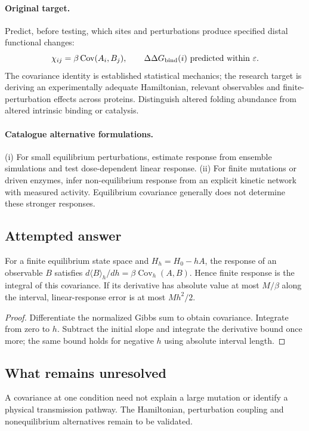 \documentclass[11pt]{article}
\begin{document}
\paragraph{Original target.}
Predict, before testing, which sites and perturbations produce specified distal functional changes:
\[\chi_{ij}=\beta\operatorname{Cov}(A_i,B_j),\qquad \Delta\Delta G_{\rm bind}(i)\ \text{predicted within }\varepsilon.\]
The covariance identity is established statistical mechanics; the research target is deriving an experimentally adequate Hamiltonian, relevant observables and finite-perturbation effects across proteins. Distinguish altered folding abundance from altered intrinsic binding or catalysis.
\paragraph{Catalogue alternative formulations.}
(i) For small equilibrium perturbations, estimate response from ensemble simulations and test dose-dependent linear response. (ii) For finite mutations or driven enzymes, infer non-equilibrium response from an explicit kinetic network with measured activity. Equilibrium covariance generally does not determine these stronger responses.
\subsection{Attempted answer}
\begin{proposition}
For a finite equilibrium state space and $H_h=H_0-hA$, the response of an observable $B$ satisfies $d\langle B\rangle_h/dh=\beta\operatorname{Cov}_h(A,B)$. Hence finite response is the integral of this covariance. If its derivative has absolute value at most $M/\beta$ along the interval, linear-response error is at most $Mh^2/2$.
\end{proposition}
\begin{proof}
Differentiate the normalized Gibbs sum to obtain covariance. Integrate from zero to $h$. Subtract the initial slope and integrate the derivative bound once more; the same bound holds for negative $h$ using absolute interval length.
\end{proof}
\subsection{What remains unresolved}
A covariance at one condition need not explain a large mutation or identify a physical transmission pathway. The Hamiltonian, perturbation coupling and nonequilibrium alternatives remain to be validated.
\end{document}
